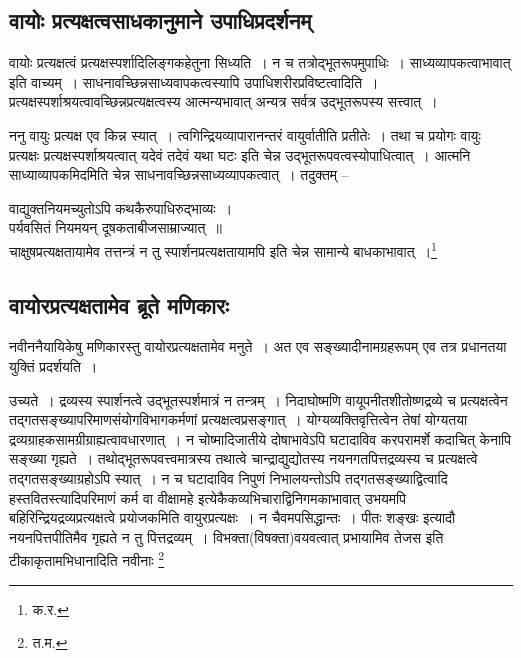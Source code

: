 		\subsection{वायोः प्रत्यक्षत्वसाधकानुमाने उपाधिप्रदर्शनम्}

		वायोः प्रत्यक्षत्वं प्रत्यक्षस्पर्शादिलिङ्गकहेतुना सिध्यति~। न च तत्रोद्भूतरूपमुपाधिः~।  साध्यव्यापकत्वाभावात् इति वाच्यम्~। साधनावच्छिन्नसाध्यवापकत्वस्यापि उपाधिशरीरप्रविष्टत्वादिति~। प्रत्यक्षस्पर्शाश्रयत्वावच्छिन्नप्रत्यक्षत्वस्य आत्मन्यभावात् अन्यत्र सर्वत्र उद्भूतरूपस्य सत्त्वात्~।

		{\fontsize{11.7}{0}\selectfont\s ननु वायुः प्रत्यक्ष एव किन्न स्यात्~। त्वगिन्द्रियव्यापारानन्तरं वायुर्वातीति प्रतीतेः~। तथा च प्रयोगः वायुः प्रत्यक्षः प्रत्यक्षस्पर्शाश्रयत्वात् यदेवं तदेवं यथा घटः इति चेन्न उद्भूतरूपवत्वस्योपाधित्वात्~। आत्मनि साध्याव्यापकमिदमिति चेन्न साधनावच्छिन्नसाध्यव्यापकत्वात्~। तदुक्तम् –\\ \begin{center}वाद्युक्तनियमच्युतोऽपि कथकैरुपाधिरुद्भाव्यः~।\\[-1mm] पर्यवसितं नियमयन् दूषकताबीजसाम्राज्यात्~॥\\ चाक्षुषप्रत्यक्षतायामेव तत्तन्त्रं न तु स्पार्शनप्रत्यक्षतायामपि इति चेन्न सामान्ये बाधकाभावात्~।\footnote{क.र.}\end{center}}

		\subsection{वायोरप्रत्यक्षतामेव ब्रूते मणिकारः}

		नवीननैयायिकेषु मणिकारस्तु वायोरप्रत्यक्षतामेव मनुते~। अत एव सङ्ख्यादीनामग्रहरूपम् एव तत्र प्रधानतया युक्तिं प्रदर्शयति~।

		{\fontsize{11.7}{0}\selectfont\s उच्यते~। द्रव्यस्य स्पार्शनत्वे उद्भूतस्पर्शमात्रं न तन्त्रम्~। निदाघोष्मणि वायूपनीतशीतोष्णद्रव्ये च प्रत्यक्षत्वेन तद्गतसङ्ख्यापरिमाणसंयोगविभागकर्मणां प्रत्यक्षत्वप्रसङ्गात्~। योग्यव्यक्तिवृत्तित्वेन तेषां योग्यतया द्रव्यग्राहकसामग्रीग्राह्यत्वावधारणात्~। न चोष्मादिजातीये दोषाभावेऽपि घटादाविव करपरामर्शे कदाचित् केनापि सङ्ख्या गृह्यते~। तथोद्भूतरूपवत्त्वमात्रस्य तथात्वे चान्द्राद्युद्योतस्य नयनगतपित्तद्रव्यस्य च प्रत्यक्षत्वे तद्गतसङ्ख्याग्रहोऽपि स्यात्~। न च घटादाविव निपुणं निभालयन्तोऽपि तद्गतसङ्ख्याद्वित्वादि हस्तवितस्त्यादिपरिमाणं कर्म वा वीक्षामहे इत्येकैकव्यभिचाराद्विनिगमकाभावात् उभयमपि बहिरिन्द्रियद्रव्यप्रत्यक्षत्वे प्रयोजकमिति वायुरप्रत्यक्षः~। न चैवमपसिद्धान्तः~। पीतः शङ्खः इत्यादौ नयनपित्तपीतिमैव गृह्यते न तु पित्तद्रव्यम्~। विभक्ता(विषक्ता)वयवत्वात् प्रभायामिव तेजस इति टीकाकृतामभिधानादिति नवीनाः \footnote{त.म.}}

